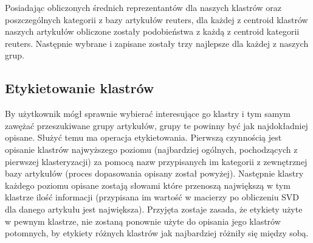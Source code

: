 Posiadając obliczonych średnich reprezentantów dla naszych klastrów oraz poszczególnych kategorii z bazy artykułów reuters, dla każdej z centroid klastrów naszych artykułów obliczone zostały podobieństwa z każdą z centroid kategorii reuters. Następnie wybrane i zapisane zostały trzy najlepsze dla każdej z naszych grup. 

\subsection{Etykietowanie klastrów}
By użytkownik mógł sprawnie wybierać interesujące go klastry i tym samym zawężać przeszukiwane grupy artykułów, grupy te powinny być jak najdokładniej opisane. Służyć temu ma operacja etykietowania. Pierwszą czynnością jest opisanie klastrów najwyższego poziomu (najbardziej ogólnych, pochodzących z pierwszej klasteryzacji) za pomocą nazw przypisanych im kategorii z zewnętrznej bazy artykułów (proces dopasowania opisany został powyżej).
Następnie klastry każdego poziomu opisane zostają słowami które przenoszą największą w tym klastrze ilość informacji (przypisana im wartość w macierzy po obliczeniu SVD dla danego artykułu jest największa). Przyjęta zostaje zasada, że etykiety użyte w pewnym klastrze, nie zostaną ponownie użyte do opisania jego klastrów potomnych, by etykiety różnych klastrów jak najbardziej różniły się między sobą.
